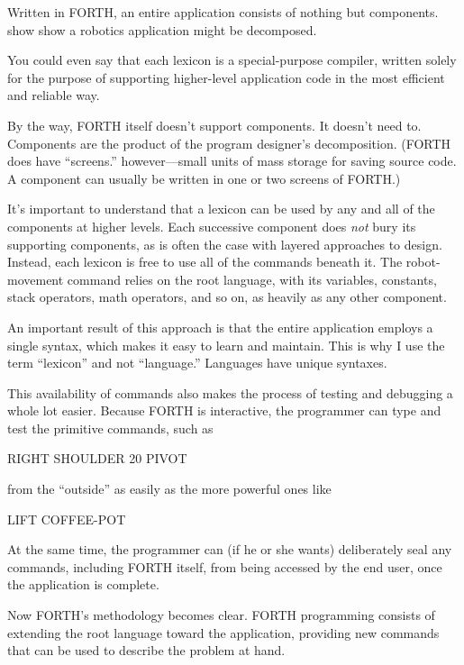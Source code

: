 Written in FORTH, an entire application consists of nothing but
components.   show show a robotics application might be
decomposed.

You could even say that each lexicon is a special-purpose compiler,
written solely for the purpose of supporting higher-level application
code in the most efficient and reliable way.

By the way, FORTH itself doesn't support components. It doesn't need
to. Components are the product of the program designer's decomposition.
(FORTH does have ``screens.''
however---small units of mass storage for saving source code. A
component can usually be written in one or two screens of FORTH.)

It's important to understand that a lexicon can be used by any and
all of the components at higher levels. Each successive component
does \emph{not} bury its supporting components, as is often the case
with layered approaches to design. Instead, each lexicon is free to
use all of the commands beneath it. The robot-movement command relies
on the root language, with its variables, constants, stack operators,
math operators, and so on, as heavily as any other component.

An important result of this approach is that the entire application
employs a single syntax, which makes it easy to learn and maintain.
This is why I use the term ``lexicon'' and not ``language.''
Languages have unique syntaxes.

This availability of commands also makes the process of testing and
debugging a whole lot easier. Because FORTH is interactive, the
programmer can type and test the primitive commands, such as
\begin{Code}
RIGHT SHOULDER 20 PIVOT
\end{Code}
from the ``outside'' as easily as the more powerful ones like

\begin{Code}
LIFT COFFEE-POT
\end{Code}
At the same time, the programmer can (if he or she wants) deliberately
seal any commands, including FORTH itself, from being accessed by the
end user, once the application is complete.

Now FORTH's methodology becomes clear. FORTH programming consists of
extending the root language toward the application, providing new
commands that can be used to describe the problem at hand.

